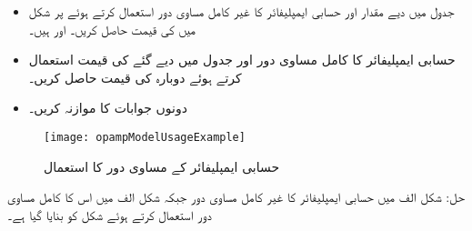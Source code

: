 \begin{itemize}
\item
جدول  میں دیے مقدار اور حسابی ایمپلیفائر کا غیر کامل مساوی دور استعمال کرتے ہوئے  پر  شکل  میں  کی قیمت حاصل کریں۔ اور  ہیں۔
\item
حسابی ایمپلیفائر کا کامل مساوی دور اور جدول  میں دیے گئے  کی قیمت استعمال کرتے ہوئے  دوبارہ   کی قیمت حاصل کریں۔
\item
دونوں جوابات کا موازنہ کریں۔
\end{itemize}
%
\begin{figure}
\centering
\texttt{[image: opampModelUsageExample]}
\caption{حسابی ایمپلیفائر کے مساوی دور کا استعمال}
\label{شکل_حسابی_ماڈل_استعمال}
\end{figure}
%
حل:
شکل  الف میں حسابی ایمپلیفائر کا غیر کامل مساوی دور جبکہ شکل  الف     میں اس کا کامل مساوی دور استعمال کرتے ہوئے شکل  کو بنایا گیا ہے۔
